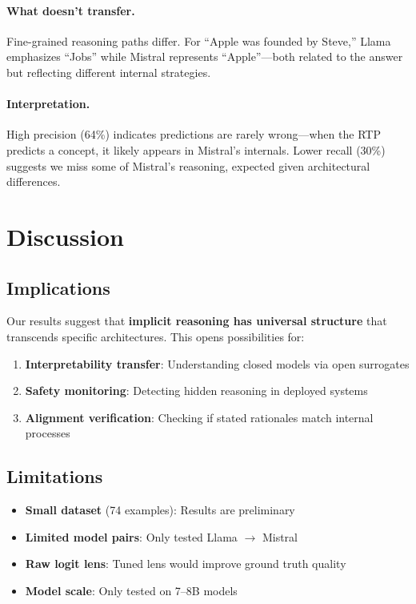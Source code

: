 \documentclass{article}
\begin{document}
\paragraph{What doesn't transfer.}
Fine-grained reasoning paths differ. For ``Apple was founded by Steve,'' Llama emphasizes ``Jobs'' while Mistral represents ``Apple''---both related to the answer but reflecting different internal strategies.

\paragraph{Interpretation.}
High precision (64\%) indicates predictions are rarely wrong---when the RTP predicts a concept, it likely appears in Mistral's internals. Lower recall (30\%) suggests we miss some of Mistral's reasoning, expected given architectural differences.

\section{Discussion}

\subsection{Implications}

Our results suggest that \textbf{implicit reasoning has universal structure} that transcends specific architectures. This opens possibilities for:

\begin{enumerate}
    \item \textbf{Interpretability transfer}: Understanding closed models via open surrogates
    \item \textbf{Safety monitoring}: Detecting hidden reasoning in deployed systems
    \item \textbf{Alignment verification}: Checking if stated rationales match internal processes
\end{enumerate}

\subsection{Limitations}

\begin{itemize}
    \item \textbf{Small dataset} (74 examples): Results are preliminary
    \item \textbf{Limited model pairs}: Only tested Llama $\rightarrow$ Mistral
    \item \textbf{Raw logit lens}: Tuned lens would improve ground truth quality
    \item \textbf{Model scale}: Only tested on 7--8B models
\end{itemize}
\end{document}
